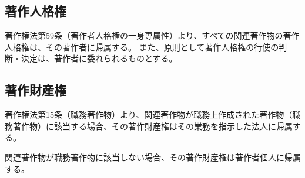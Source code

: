 \subsection{著作人格権}
著作権法第59条（著作者人格権の一身専属性）より、すべての関連著作物の著作人格権は、その著作者に帰属する。
また、原則として著作人格権の行使の判断・決定は、著作者に委れられるものとする。


\subsection{著作財産権}
著作権法第15条（職務著作物）より、関連著作物が職務上作成された著作物（職務著作物）に該当する場合、その著作財産権はその業務を指示した法人に帰属する。

関連著作物が職務著作物に該当しない場合、その著作財産権は著作者個人に帰属する。




